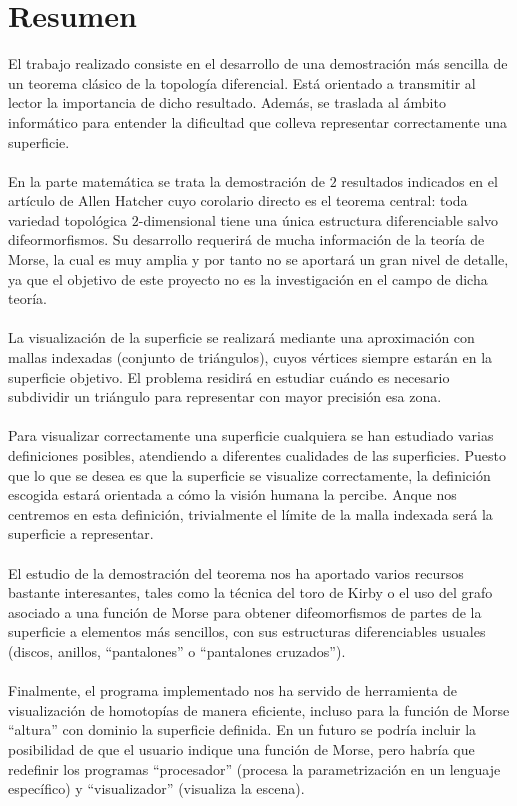 %

\chapter{Resumen}
El trabajo realizado consiste en el desarrollo de una demostración más sencilla de un teorema clásico de la topología diferencial. Está orientado a transmitir al lector la importancia de dicho resultado. Además, se traslada al ámbito informático para entender la dificultad que colleva representar correctamente una superficie.\\
\\En la parte matemática se trata la demostración de $2$ resultados indicados en el artículo de Allen Hatcher \cite{arXiv:1312.3518} cuyo corolario directo es el teorema central: toda variedad topológica $2$-dimensional tiene una única estructura diferenciable salvo difeormorfismos. Su desarrollo requerirá de mucha información de la teoría de Morse, la cual es muy amplia y por tanto no se aportará un gran nivel de detalle, ya que el objetivo de este proyecto no es la investigación en el campo de dicha teoría.\\
\\La visualización de la superficie se realizará mediante una aproximación con mallas indexadas (conjunto de triángulos), cuyos vértices siempre estarán en la superficie objetivo. El problema residirá en estudiar cuándo es necesario subdividir un triángulo para representar con mayor precisión esa zona.\\
\\Para visualizar correctamente una superficie cualquiera se han estudiado varias definiciones posibles, atendiendo a diferentes cualidades de las superficies. Puesto que lo que se desea es que la superficie se visualize correctamente, la definición escogida estará orientada a cómo la visión humana la percibe. Anque nos centremos en esta definición, trivialmente el límite de la malla indexada será la superficie a representar.\\
\\El estudio de la demostración del teorema nos ha aportado varios recursos bastante interesantes, tales como la técnica del toro de Kirby o el uso del grafo asociado a una función de Morse para obtener difeomorfismos de partes de la superficie a elementos más sencillos, con sus estructuras diferenciables usuales (discos, anillos, ``pantalones'' o ``pantalones cruzados'').\\
\\Finalmente, el programa implementado nos ha servido de herramienta de visualización de homotopías de manera eficiente, incluso para la función de Morse ``altura'' con dominio la superficie definida. En un futuro se podría incluir la posibilidad de que el usuario indique una función de Morse, pero habría que redefinir los programas ``procesador'' (procesa la parametrización en un lenguaje específico) y ``visualizador'' (visualiza la escena).\\


